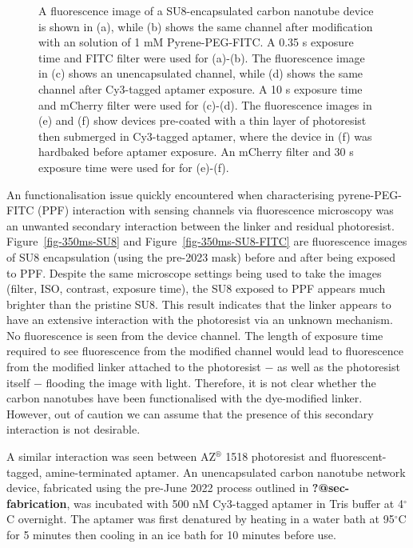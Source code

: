 \documentclass[
  a4paper,
]{scrbook}
\begin{document}
\begin{figure}
\begin{minipage}[t]{0.47\linewidth}
{{}

}

\subcaption{\label{fig-aptamer-photoresist-4}}
\end{minipage}%

\caption{\label{fig-photoresist-contamination}A fluorescence image of a
SU8-encapsulated carbon nanotube device is shown in (a), while (b) shows
the same channel after modification with an solution of 1 mM
Pyrene-PEG-FITC. A 0.35 s exposure time and FITC filter were used for
(a)-(b). The fluorescence image in (c) shows an unencapsulated channel,
while (d) shows the same channel after Cy3-tagged aptamer exposure. A 10
s exposure time and mCherry filter were used for (c)-(d). The
fluorescence images in (e) and (f) show devices pre-coated with a thin
layer of photoresist then submerged in Cy3-tagged aptamer, where the
device in (f) was hardbaked before aptamer exposure. An mCherry filter
and 30 s exposure time were used for for (e)-(f).}

\end{figure}

An functionalisation issue quickly encountered when characterising
pyrene-PEG-FITC (PPF) interaction with sensing channels via fluorescence
microscopy was an unwanted secondary interaction between the linker and
residual photoresist. Figure~\ref{fig-350ms-SU8} and
Figure~\ref{fig-350ms-SU8-FITC} are fluorescence images of SU8
encapsulation (using the pre-2023 mask) before and after being exposed
to PPF. Despite the same microscope settings being used to take the
images (filter, ISO, contrast, exposure time), the SU8 exposed to PPF
appears much brighter than the pristine SU8. This result indicates that
the linker appears to have an extensive interaction with the photoresist
via an unknown mechanism. No fluorescence is seen from the device
channel. The length of exposure time required to see fluorescence from
the modified channel would lead to fluorescence from the modified linker
attached to the photoresist \(-\) as well as the photoresist itself
\(-\) flooding the image with light. Therefore, it is not clear whether
the carbon nanotubes have been functionalised with the dye-modified
linker. However, out of caution we can assume that the presence of this
secondary interaction is not desirable.

A similar interaction was seen between AZ\(^\circledR\) 1518 photoresist
and fluorescent-tagged, amine-terminated aptamer. An unencapsulated
carbon nanotube network device, fabricated using the pre-June 2022
process outlined in \textbf{?@sec-fabrication}, was incubated with 500
nM Cy3-tagged aptamer in Tris buffer at 4\(^\circ\)C overnight. The
aptamer was first denatured by heating in a water bath at 95\(^\circ\)C
for 5 minutes then cooling in an ice bath for 10 minutes before use.
\end{document}
